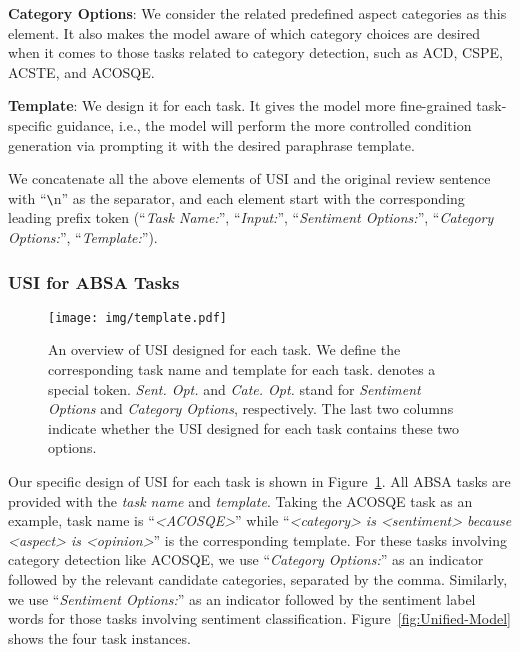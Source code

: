 \documentclass[11pt]{article}
\newcommand{\USI}{\textsc{USI}\xspace}
\newcommand{\template}[1]{{\emph{#1}}}
\begin{document}
\noindent\textbf{Category Options}: We consider the related predefined aspect categories as this element. It also makes the model aware of which category choices are desired when it comes to those tasks related to category detection, such as ACD, CSPE, ACSTE, and ACOSQE.

\noindent\textbf{Template}: We design it for each task. It gives the model more fine-grained task-specific guidance, i.e., the model will perform the more controlled condition generation via prompting it with the desired paraphrase template.

We concatenate all the above elements of \USI and the original review sentence with ``\verb|\|n'' as the separator, and each element start with the corresponding leading prefix token (``\template{Task Name:}'', ``\template{Input:}'', ``\template{Sentiment Options:}'', ``\template{Category Options:}'', ``\template{Template:}'').

\subsubsection{USI for ABSA Tasks}
\label{sec:USI-for-ABSA}

\begin{figure}[h]
\centering 
\texttt{[image: img/template.pdf]} 
\caption{An overview of \USI designed for each task. We define the corresponding task name and template for each task.  denotes a special token. \emph{Sent. Opt.} and \emph{Cate. Opt.} stand for \emph{Sentiment Options} and \emph{Category Options}, respectively. The last two columns indicate whether the \USI designed for each task contains these two options.} 
\vspace{-3mm}
\label{fig:template-for-all-tasks}
\end{figure}

Our specific design of \USI for each task is shown in Figure~\ref{fig:template-for-all-tasks}. All ABSA tasks are provided with the \emph{task name} and \emph{template}. Taking the ACOSQE task as an example, task name is ``\emph{<ACOSQE>}'' while ``\emph{<category> is <sentiment> because <aspect> is <opinion>}'' is the corresponding template. For these tasks involving category detection like ACOSQE, we use ``\template{Category Options:}'' as an indicator followed by the relevant candidate categories, separated by the comma. Similarly, we use ``\template{Sentiment Options:}'' as an indicator followed by the sentiment label words for those tasks involving sentiment classification.
Figure~\ref{fig:Unified-Model} shows the four task instances.
\end{document}
